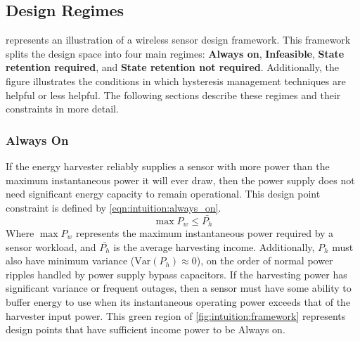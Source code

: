 
\subsection{Design Regimes}
\label{sec:framework:regime}
 represents an illustration of a wireless sensor design framework.
This framework splits the design space into four main regimes: \textbf{Always on},
\textbf{Infeasible}, \textbf{State retention required}, and \textbf{State retention not required}.
Additionally, the figure illustrates the conditions in which hysteresis management techniques are helpful or less helpful.
The following sections describe these regimes and their constraints in more detail. 

\subsubsection{Always On} 
If the energy harvester reliably supplies a sensor with
more power than the maximum instantaneous power it will ever draw, then the power supply does not need significant
energy capacity to remain operational. 
This design point constraint is defined by \cref{eqn:intuition:always_on}.
\begin{equation}
    \label{eqn:intuition:always_on}
    \max P_w \leq \bar{P_h}
\end{equation}
Where $\max P_w$ represents the maximum instantaneous power required by a sensor workload, and $\bar{P_h}$ is the average harvesting income. Additionally, $P_h$ must also have minimum variance ($\mathrm{Var}(P_h) \approx 0$), on the order of normal power ripples handled by power supply bypass capacitors.
If the harvesting power has significant variance or frequent outages, 
then a sensor must have some ability to buffer energy to use when its
instantaneous operating power exceeds that of the harvester input power.
This green region of \cref{fig:intuition:framework} represents design points that have sufficient income power to be \textsf{Always on}.

